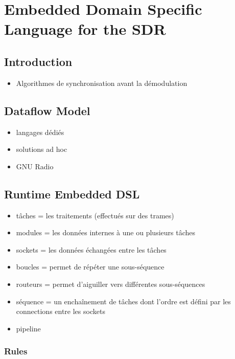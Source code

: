 \chapter{Embedded Domain Specific Language for the SDR}

\section{Introduction}

\begin{itemize}
  \item Algorithmes de synchronisation avant la démodulation
\end{itemize}

\section{Dataflow Model}

\begin{itemize}
  \item langages dédiés
  \item solutions ad hoc
  \item GNU Radio
\end{itemize}

\section{Runtime Embedded DSL}

\begin{itemize}
  \item tâches = les traitements (effectués sur des trames)
  \item modules = les données internes à une ou plusieurs tâches
  \item sockets = les données échangées entre les tâches
  \item boucles = permet de répéter une sous-séquence
  \item routeurs = permet d'aiguiller vers différentes sous-séquences
  \item séquence = un enchaînement de tâches dont l'ordre est défini par les
        connections entre les sockets
  \item pipeline
\end{itemize}

\subsection{Rules}

